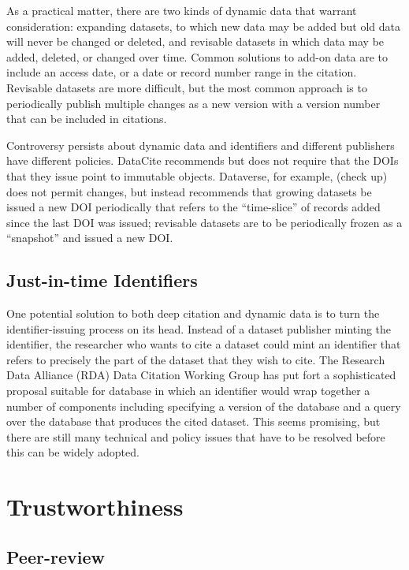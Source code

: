 \documentclass[10pt,a4paper,twocolumn]{article}
\begin{document}
As a practical matter, there are two kinds of dynamic data that warrant consideration: expanding datasets, to which new data may be added but old data will never be changed or deleted, and revisable datasets in which data may be added, deleted, or changed over time. 
Common solutions to add-on data are to include an access date, or a date or record number range in the citation. 
Revisable datasets are more difficult, but the most common approach is to periodically publish multiple changes as a new version with a version number that can be included in citations.

Controversy persists about dynamic data and identifiers and different publishers have different policies. 
DataCite recommends but does not require that the DOIs that they issue point to immutable objects. 
Dataverse, for example, (check up) does not permit changes, but instead recommends that growing datasets be issued a new DOI periodically that refers to the ``time-slice'' of records added since the last DOI was issued; revisable datasets are to be periodically frozen as a ``snapshot'' and issued a new DOI.

\subsection*{Just-in-time Identifiers}\label{just-in-time-identifiers}

One potential solution to both deep citation and dynamic data is to turn the identifier-issuing process on its head. 
Instead of a dataset publisher minting the identifier, the researcher who wants to cite a dataset could mint an identifier that refers to precisely the part of the dataset that they wish to cite. 
The Research Data Alliance (RDA) Data Citation Working Group has put fort a sophisticated proposal suitable for database in which an identifier would wrap together a number of components including specifying a version of the database and a query over the database that produces the cited dataset. 
This seems promising, but there are still many technical and policy issues that have to be resolved before this can be widely adopted.

\section*{Trustworthiness}\label{trustworthiness}

\subsection*{Peer-review}\label{peer-review}
\end{document}
